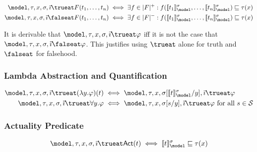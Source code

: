 \documentclass[../LogosReference.tex]{subfiles}
\begin{document}
\begin{definition}\label{def:atomic-truth}
	\begin{align}
		\model, \history, x, \assignment, \tempindex \trueat F(t_1, \ldots, t_n)    & \iff \exists f \in \verifierset{F} : f(\sem{t_1}^\assignment_\model, \ldots, \sem{t_n}^\assignment_\model) \parthood \history(x)  \\
		\model, \history, x, \assignment, \tempindex \falseat F(t_1, \ldots, t_n) & \iff \exists f \in \falsifierset{F} : f(\sem{t_1}^\assignment_\model, \ldots, \sem{t_n}^\assignment_\model) \parthood \history(x)
	\end{align}
\end{definition}

\begin{remark}
	It is derivable that $\model, \history, x, \assignment, \tempindex \trueat \metaA$ iff it is not the case that $\model, \history, x, \assignment, \tempindex \falseat \metaA$.
	This justifies using $\trueat$ alone for truth and $\falseat$ for falsehood.
\end{remark}

\subsubsection{Lambda Abstraction and Quantification}

\begin{definition}\label{def:lambda-quant-truth}
	\begin{align}
		\model, \history, x, \assignment, \tempindex \trueat (\lambda y.\metaA)(t) & \iff \model, \history, x, \assignsub{\sem{t}^\assignment_\model}{y}, \tempindex \trueat \metaA           \\
		\model, \history, x, \assignment, \tempindex \trueat \forall y.\metaA      & \iff \model, \history, x, \assignsub{s}{y}, \tempindex \trueat \metaA \text{ for all } s \in \statespace
	\end{align}
\end{definition}

\subsubsection{Actuality Predicate}

\begin{definition}[Actuality]\label{def:actuality-truth}
	\[
		\model, \history, x, \assignment, \tempindex \trueat \actual(t) \iff \sem{t}^\assignment_\model \parthood \history(x)
	\]
\end{definition}
\end{document}
